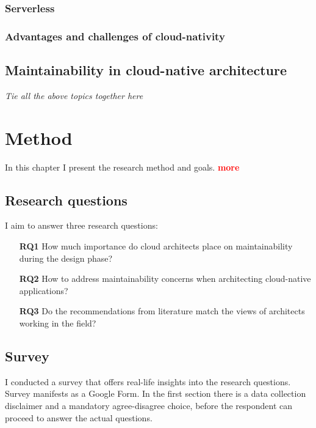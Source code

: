 \documentclass[utf8,english]{gradu3}
\newcommand{\todo}[1]{\textbf{\textcolor{red}{#1}}}
\newcommand{\tmp}[1]{\textit{{#1}}}
\begin{document}
\subsection{Serverless}

\subsection{Advantages and challenges of cloud-nativity}

\section{Maintainability in cloud-native architecture}
\tmp{Tie all the above topics together here}

\chapter{Method}
\label{chapter:method}

In this chapter I present the research method and goals. \todo{more}

\section{Research questions}

I aim to answer three research questions:
\begin{itemize}
  \item [\textbf{RQ1}] How much importance do cloud architects place on maintainability during
        the design phase?
  \item [\textbf{RQ2}] How to address maintainability concerns when architecting cloud-native
        applications?
  \item [\textbf{RQ3}] Do the recommendations from literature match the views of architects
        working in the field?
\end{itemize}


\section{Survey}

I conducted a survey that offers real-life insights into the research questions.
Survey manifests as a Google Form.
In the first section there is a data collection disclaimer and a mandatory agree-disagree choice,
before the respondent can proceed to answer the actual questions.
\end{document}
